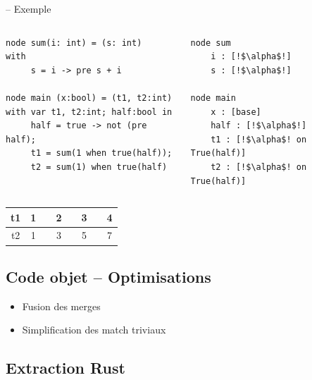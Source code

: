 \documentclass[11pt,usenames,dvipsnames]{beamer}
\begin{document}
\begin{frame}[fragile]{-- Exemple}
  \begin{columns}
    \begin{column}{0.5\textwidth}
      \begin{lstlisting}[language=minils]
node sum(i: int) = (s: int)
with
     s = i -> pre s + i

node main (x:bool) = (t1, t2:int)
with var t1, t2:int; half:bool in
     half = true -> not (pre half);
     t1 = sum(1 when true(half));
     t2 = sum(1) when true(half)
   \end{lstlisting}
 \end{column}
 \begin{column}{0.5\textwidth}
   \pause
   \begin{lstlisting}[escapechar=!]
node sum
    i : [!$\alpha$!]
    s : [!$\alpha$!]

node main
    x : [base]
    half : [!$\alpha$!]
    t1 : [!$\alpha$! on True(half)]
    t2 : [!$\alpha$! on True(half)]
  \end{lstlisting}
 \end{column}
\end{columns}
\pause
\begin{center}
  \begin{tabular}{|c|ccccccc|}
    \hline
    t1    & 1 &  & 2 & & 3 & & 4\\
    \hline
    t2    & 1 &  & 3 & & 5 & & 7\\
    \hline
  \end{tabular}
\end{center}
\end{frame}

\subsection{Code objet -- Optimisations}
\begin{frame}{\null}
  \begin{itemize}
  \item Fusion des merges
  \item Simplification des match triviaux
  \end{itemize}
\end{frame}

\subsection{Extraction Rust}
\end{document}
